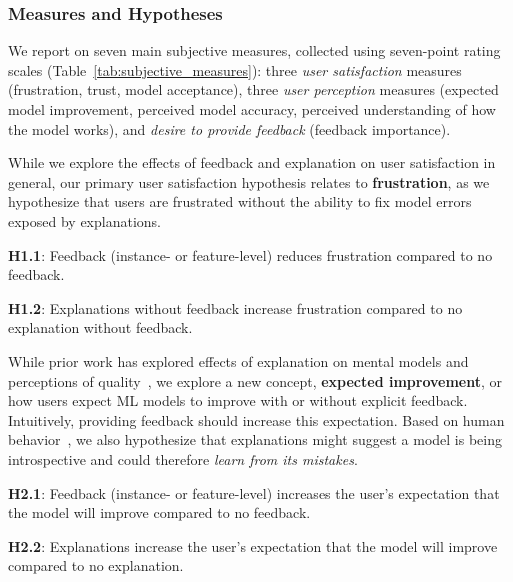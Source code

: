 \subsubsection{Measures and Hypotheses}
We report on seven main subjective measures, collected using seven-point rating scales (Table~\ref{tab:subjective_measures}): three \textit{user satisfaction} measures (frustration, trust, model acceptance), three \textit{user perception} measures (expected model improvement, perceived model accuracy, perceived understanding of how the model works), and \textit{desire to provide feedback} (feedback importance). 

While we explore the effects of feedback and explanation on user satisfaction in general, our primary user satisfaction hypothesis relates to \textbf{frustration}, as we hypothesize that users are frustrated without the ability to fix model errors exposed by explanations.

\begin{itemize*}
    \item \textbf{H1.1}: Feedback (instance- or feature-level) reduces frustration compared to no feedback.
    \item \textbf{H1.2}: Explanations without feedback increase frustration compared to no explanation without feedback. 
\end{itemize*}

While prior work has explored effects of explanation on mental models and perceptions of quality~\cite{Bilgic2005ExplainingPromotion,Lim2009WhySystems}, we explore a new concept, \textbf{expected improvement}, or how users expect ML models to improve with or without explicit feedback. %
Intuitively, providing feedback should increase this expectation. Based on human behavior~\cite{Siegler2009MicrogeneticSelf-explanation}, we also hypothesize that explanations might suggest a model is being introspective and could therefore \textit{learn from its mistakes}. 

\begin{itemize*}
    \item \textbf{H2.1}: Feedback (instance- or feature-level) increases the user's expectation that the model will improve compared to no feedback.
    \item \textbf{H2.2}: Explanations increase the user's expectation that the model will improve compared to no explanation. 
\end{itemize*}

